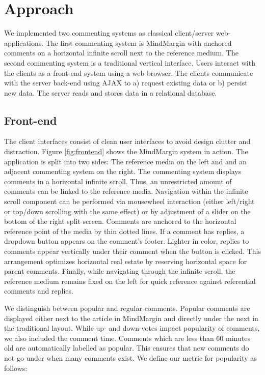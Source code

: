 \section {Approach}

We implemented two commenting systems as classical client/server web-applications. The first commenting system is MindMargin with anchored comments on a horizontal infinite scroll next to the reference medium. The second commenting system is a traditional vertical interface. Users interact with the clients as a front-end system using a web browser. The clients communicate with the server back-end using AJAX to a) request existing data or b) persist new data. The server reads and stores data in a relational database.

\subsection{Front-end}
The client interfaces consist of clean user interfaces to avoid design clutter and distraction. Figure \ref{fig:frontend} shows the MindMargin system in action. The application is split into two sides: The reference media on the left and and an adjacent commenting system on the right. The commenting system displays comments in a horizontal infinite scroll. Thus, an unrestricted amount of comments can be linked to the reference media. Navigation within the infinite scroll component can be performed via mousewheel interaction (either left/right or top/down scrolling with the same effect) or by adjustment of a slider on the bottom of the right split screen. Comments are anchored to the horizontal reference point of the media by thin dotted lines. If a comment has replies, a dropdown button appears on the comment's footer. Lighter in color, replies to comments appear vertically under their comment when the button is clicked. This arrangement optimizes horizontal real estate by reserving horizontal space for parent comments. Finally, while navigating through the infinite scroll, the reference medium remains fixed on the left for quick reference against referential comments and replies.

We distinguish between popular and regular comments. Popular comments are displayed either next to the article in MindMargin and directly under the next in the traditional layout. While up- and down-votes impact popularity of comments, we also included the comment time. Comments which are less than 60 minutes old are automatically labelled as popular. This ensures that new comments do not go under when many comments exist. We define our metric for popularity as follows:

